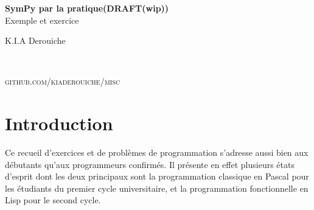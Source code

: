 \documentclass[11pt,fleqn]{book} %
\begin{document}

\begingroup
\thispagestyle{empty}
\centering
\vspace*{5cm}
\par\normalfont\fontsize{35}{35}\sffamily\selectfont
\textbf{SymPy par la pratique(DRAFT(wip))}\\
{\LARGE Exemple et exercice}\par %
\vspace*{1cm}
{\Huge K.I.A Derouiche}\par %
\endgroup


\newpage
~\vfill
\thispagestyle{empty}

\noindent \textsc{github.com/kiaderouiche/misc}\\ %




\pagestyle{empty} %

\tableofcontents %


\pagestyle{fancy} %




\section{Introduction}
Ce recueil d'exercices et de problèmes de programmation s'adresse aussi bien aux débutants qu'aux programmeurs confirmés. Il présente en effet plusieurs états d'esprit dont les deux principaux sont la programmation classique en Pascal pour les étudiants du premier cycle universitaire, et la programmation fonctionnelle en Lisp pour le second cycle.
\end{document}
